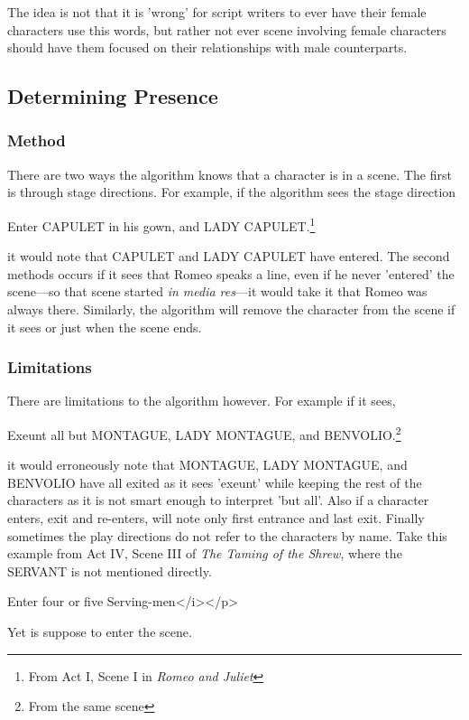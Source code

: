 \documentclass[12pt]{article}
\begin{document}
The idea is not that it is 'wrong' for script writers to ever have their female
characters use this words, but rather not ever scene involving female
characters should have them focused on their relationships with male
counterparts.

\subsection{Determining Presence}
\label{sub:determining_presence}

\subsubsection{Method}
\label{ssub:method}


There are two ways the algorithm knows that a character is in a scene. The
first is through stage directions. For example, if the algorithm sees the stage
direction 
\begin{displayquote}
Enter CAPULET in his gown, and LADY CAPULET.\footnote{From Act
    I, Scene I in \emph{Romeo and Juliet}}
\end{displayquote}
it would note that CAPULET and LADY CAPULET have entered. The second methods
occurs if it sees that Romeo speaks a line, even if he never 'entered' the
scene---so that scene started \textit{in media res}---it would take it that
Romeo was always there. Similarly, the algorithm will remove the character from
the scene if it sees  or just when the scene ends.

\subsubsection{Limitations}
\label{ssub:limitations}

There are limitations to the algorithm however. For example if it sees,
\begin{displayquote}
Exeunt all but MONTAGUE, LADY MONTAGUE, and BENVOLIO.\footnote{From
the same scene}
\end{displayquote}
it would erroneously note that MONTAGUE, LADY MONTAGUE, and BENVOLIO have all
exited as it sees 'exeunt' while keeping the rest of the characters as it is
not smart enough to interpret 'but all'. Also if a character enters, exit and
re-enters, will note only first entrance and last exit. Finally sometimes the
play directions do not refer to the characters by name. Take this example
from Act IV, Scene III of \emph{The Taming of the Shrew}, where the SERVANT is
not mentioned directly.
\begin{displayquote}
Enter four or five Serving-men</i></p>
\end{displayquote}
Yet is suppose to enter the scene.  
\end{document}
